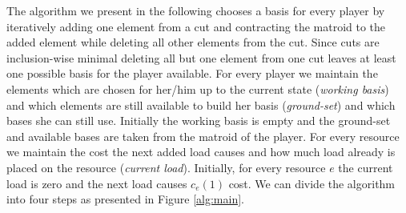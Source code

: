 \documentclass{scrartcl}
\theoremstyle{nonumberplain}
\begin{document}
The algorithm we present in the following chooses a basis for every player by
iteratively adding one element from a cut and contracting the matroid to the
added element while deleting all other elements from the cut. Since cuts are
inclusion-wise minimal deleting all but one element from one cut leaves at
least one possible basis for the player available. For every player we maintain
the elements which are chosen for her/him up to the current state
(\emph{working basis}) and which elements are still available to build her
basis (\emph{ground-set}) and which bases she can still use. Initially the
working basis is empty and the ground-set and available bases are taken from
the matroid of the player. For every resource we maintain the cost the next
added load causes and how much load already is placed on the resource
(\emph{current load}). Initially, for every resource $e$ the current
load is zero and the next load causes $c_{e}(1)$ cost. We can divide the
algorithm into four steps as presented in Figure \ref{alg:main}.
\end{document}
